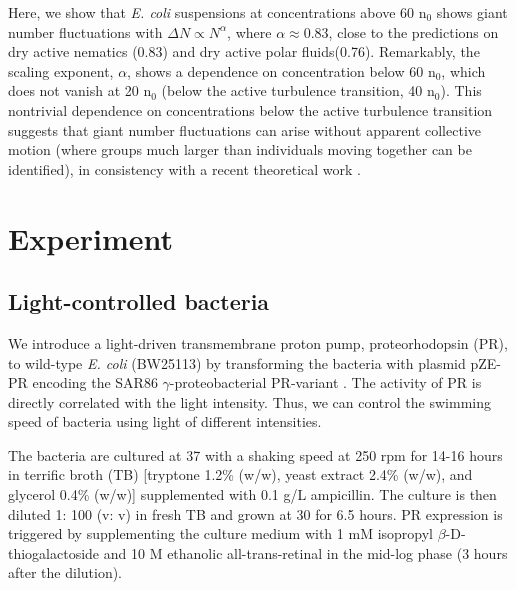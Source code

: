 \documentclass[twocolumn,aps,pre,amsmath,amssymb,floatfix,longbibliography]{revtex4-1}
\begin{document}
Here, we show that \textit{E. coli} suspensions at concentrations above 60 n$_0$ shows giant number fluctuations with $\Delta N \varpropto N^\alpha$, where $\alpha\approx0.83$, close to the predictions on dry active nematics (0.83) and dry active polar fluids(0.76). Remarkably, the scaling exponent, $\alpha$, shows a dependence on concentration below 60 n$_0$, which does not vanish at 20 n$_0$ (below the active turbulence transition, 40 n$_0$). This nontrivial dependence on concentrations below the active turbulence transition suggests that giant number fluctuations can arise without apparent collective motion (where groups much larger than individuals moving together can be identified), in consistency with a recent theoretical work \cite{PhysRevLett.119.028005}.



\section{Experiment}

\subsection{Light-controlled bacteria}
We introduce a light-driven transmembrane proton pump, proteorhodopsin (PR), to wild-type \textit{E. coli} (BW25113) by transforming the bacteria with plasmid pZE-PR encoding the SAR86 $\gamma$-proteobacterial PR-variant \cite{Walter2408}. The activity of PR is directly correlated with the light intensity. Thus, we can control the swimming speed of bacteria using light of different intensities.

The bacteria are cultured at 37 \textcelsius with a shaking speed at 250 rpm for 14-16 hours in terrific broth (TB) [tryptone 1.2\% (w/w), yeast extract 2.4\% (w/w), and glycerol 0.4\% (w/w)] supplemented with 0.1 g/L ampicillin. The culture is then diluted 1: 100 (v: v) in fresh TB and grown at 30 \textcelsius for 6.5 hours. PR expression is triggered by supplementing the culture medium with 1 mM isopropyl $\beta$-D-thiogalactoside and 10 \textmu M ethanolic all-trans-retinal in the mid-log phase (3 hours after the dilution).
\end{document}
